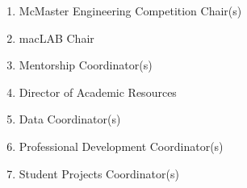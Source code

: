 \begin{enumerate}
  \begin{enumerate}
   \item
    McMaster Engineering Competition Chair(s)
   \item
    macLAB Chair
   \item
    Mentorship Coordinator(s)
   \item
    Director of Academic Resources
   \item
    Data Coordinator(s)
   \item
    Professional Development Coordinator(s)
   \item
    Student Projects Coordinator(s)

  \end{enumerate}
\end{enumerate}